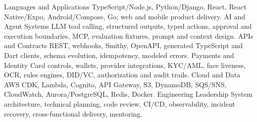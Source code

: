 
\begin{cvskills}
\cvskill
  {Languages and Applications}
  {TypeScript/Node.js, Python/Django, React, React Native/Expo, Android/Compose, Go; web and mobile product delivery.}
\cvskill
  {AI and Agent Systems}
  {LLM tool calling, structured outputs, typed actions, approval and execution boundaries, MCP, evaluation fixtures, prompt and context design.}
\cvskill
  {APIs and Contracts}
  {REST, webhooks, Smithy, OpenAPI, generated TypeScript and Dart clients, schema evolution, idempotency, modeled errors.}
\cvskill
  {Payments and Identity}
  {Card controls, wallets, provider integrations, KYC/AML, face liveness, OCR, rules engines, DID/VC, authorization and audit trails.}
\cvskill
  {Cloud and Data}
  {AWS CDK, Lambda, Cognito, API Gateway, S3, DynamoDB, SQS/SNS, CloudWatch, Aurora/PostgreSQL, Redis, Docker.}
\cvskill
  {Engineering Leadership}
  {System architecture, technical planning, code review, CI/CD, observability, incident recovery, cross-functional delivery, mentoring.}
\end{cvskills}
